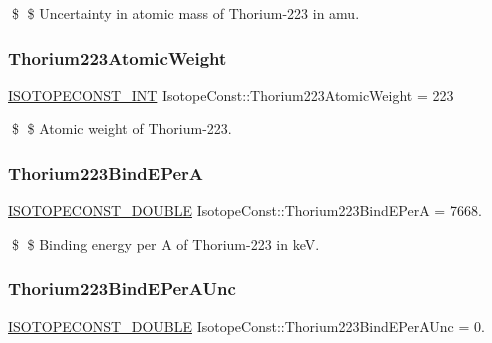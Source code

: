 \$ \$ Uncertainty in atomic mass of Thorium-\/223 in amu. \mbox{\label{group___isotope_const-_thorium-_th223_gacef5b9014501f7e1511b495fc7b44dad}} 
\subsubsection{\texorpdfstring{Thorium223\+Atomic\+Weight}{Thorium223AtomicWeight}}
{\footnotesize\ttfamily \mbox{\hyperlink{group___isotope_const-_macros_ga5f18360b3e99483a35c32d789e62621c}{I\+S\+O\+T\+O\+P\+E\+C\+O\+N\+S\+T\+\_\+\+I\+NT}} Isotope\+Const\+::\+Thorium223\+Atomic\+Weight = 223}

\$ \$ Atomic weight of Thorium-\/223. \mbox{\label{group___isotope_const-_thorium-_th223_gac201a2c978b5c208d8be511a7a2d52a9}} 
\subsubsection{\texorpdfstring{Thorium223\+Bind\+E\+PerA}{Thorium223BindEPerA}}
{\footnotesize\ttfamily \mbox{\hyperlink{group___isotope_const-_macros_ga8f45a7272ce02c0b4c65c44636ed719a}{I\+S\+O\+T\+O\+P\+E\+C\+O\+N\+S\+T\+\_\+\+D\+O\+U\+B\+LE}} Isotope\+Const\+::\+Thorium223\+Bind\+E\+PerA = 7668.}

\$ \$ Binding energy per A of Thorium-\/223 in keV. \mbox{\label{group___isotope_const-_thorium-_th223_gae49efda5fe86d9c97fddd2f443fda19f}} 
\subsubsection{\texorpdfstring{Thorium223\+Bind\+E\+Per\+A\+Unc}{Thorium223BindEPerAUnc}}
{\footnotesize\ttfamily \mbox{\hyperlink{group___isotope_const-_macros_ga8f45a7272ce02c0b4c65c44636ed719a}{I\+S\+O\+T\+O\+P\+E\+C\+O\+N\+S\+T\+\_\+\+D\+O\+U\+B\+LE}} Isotope\+Const\+::\+Thorium223\+Bind\+E\+Per\+A\+Unc = 0.}


